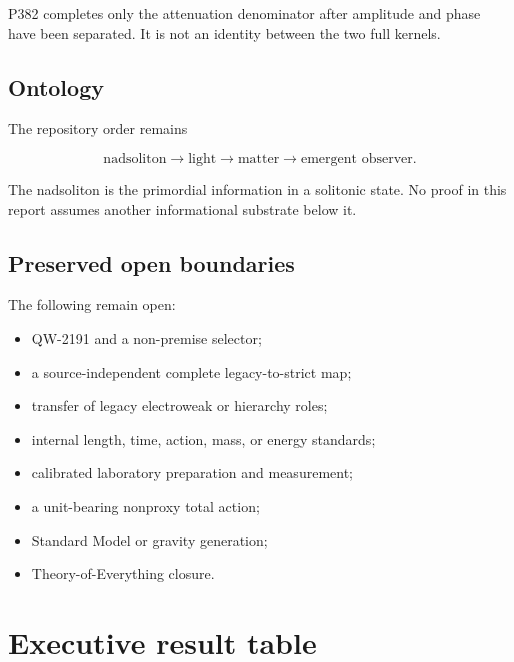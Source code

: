 \documentclass[11pt,a4paper,openany]{report}
\begin{document}
P382 completes only the attenuation denominator after amplitude and phase have been separated. It is not an identity between the two full kernels.

\section{Ontology}

The repository order remains

\[
\text{nadsoliton}
\longrightarrow
\text{light}
\longrightarrow
\text{matter}
\longrightarrow
\text{emergent observer}.
\]

The nadsoliton is the primordial information in a solitonic state. No proof in this report assumes another informational substrate below it.

\section{Preserved open boundaries}

The following remain open:

\begin{itemize}
\item 
QW-2191 and a non-premise selector;

\item 
a source-independent complete legacy-to-strict map;

\item 
transfer of legacy electroweak or hierarchy roles;

\item 
internal length, time, action, mass, or energy standards;

\item 
calibrated laboratory preparation and measurement;

\item 
a unit-bearing nonproxy total action;

\item 
Standard Model or gravity generation;

\item 
Theory-of-Everything closure.

\end{itemize}

\chapter{Executive result table}
\end{document}
